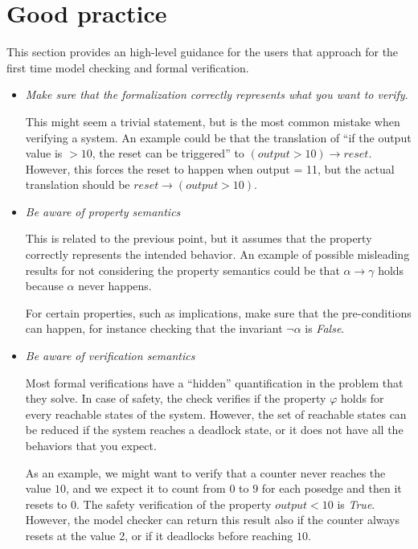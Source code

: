 \documentclass{article}
\theoremstyle{definition}
\begin{document}
\section{Good practice}

This section provides an high-level guidance for the users that
approach for the first time model checking and formal verification.

\begin{itemize}
\item \textit{Make sure that the formalization correctly represents
  what you want to verify}.

  This might seem a trivial statement, but is the most common mistake
  when verifying a system. An example could be that the translation of
  ``if the output value is $> 10$, the reset can be triggered'' to
  $(output > 10) \rightarrow reset$. However, this forces the reset to
  happen when output = 11, but the actual translation should be $reset
  \rightarrow (output > 10)$.

\item \textit{Be aware of property semantics}

  This is related to the previous point, but it assumes that the
  property correctly represents the intended behavior. An example of
  possible misleading results for not considering the property
  semantics could be that $\alpha \rightarrow \gamma$ holds because
  $\alpha$ never happens.

  For certain properties, such as implications, make sure that the
  pre-conditions can happen, for instance checking that the invariant
  $\neg \alpha$ is \emph{False}.

\item \textit{Be aware of verification semantics}

  Most formal verifications have a ``hidden'' quantification in the
  problem that they solve. In case of safety, the check verifies if
  the property $\varphi$ holds for every reachable states of the
  system. However, the set of reachable states can be reduced if the
  system reaches a deadlock state, or it does not have all the
  behaviors that you expect.

  As an example, we might want to verify that a counter never reaches
  the value $10$, and we expect it to count from $0$ to $9$ for each
  posedge and then it resets to $0$. The safety verification of the
  property $output < 10$ is \emph{True}.  However, the model checker
  can return this result also if the counter always resets at the
  value 2, or if it deadlocks before reaching $10$.


\end{itemize}
\end{document}
